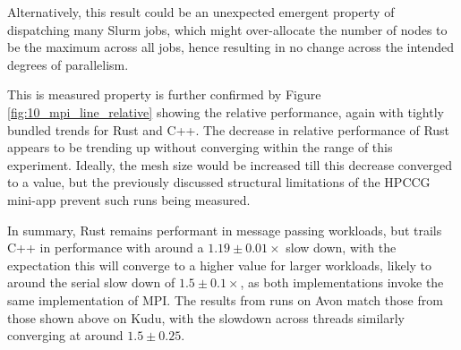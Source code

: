 Alternatively, this result could be an unexpected emergent property of dispatching many Slurm jobs, which might over-allocate the number of nodes to be the maximum across all jobs, hence resulting in no change across the intended degrees of parallelism.

This is measured property is further confirmed by Figure \ref{fig:10_mpi_line_relative} showing the relative performance, again with tightly bundled trends for Rust and C++. The decrease in relative performance of Rust appears to be trending up without converging within the range of this experiment. Ideally, the mesh size would be increased till this decrease converged to a value, but the previously discussed structural limitations of the HPCCG mini-app prevent such runs being measured.

In summary, Rust remains performant in message passing workloads, but trails C++ in performance with around a $1.19 \pm 0.01\times$ slow down, with the expectation this will converge to a higher value for larger workloads, likely to around the serial slow down of $1.5 \pm 0.1\times$, as both implementations invoke the same implementation of MPI. The results from runs on Avon match those from those shown above on Kudu, with the slowdown across threads similarly converging at around $1.5 \pm 0.25$.




